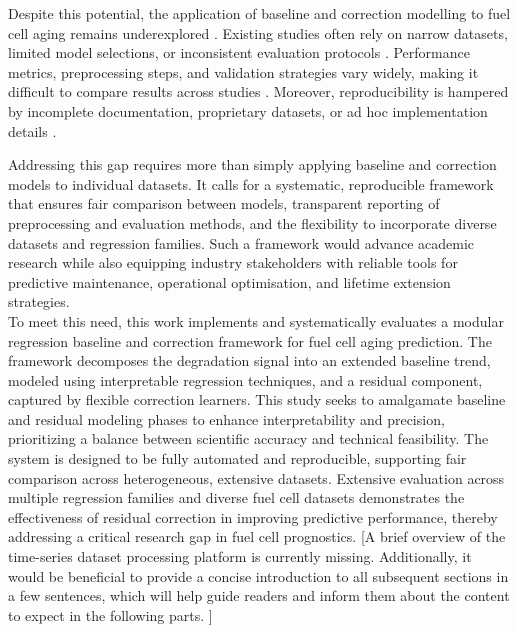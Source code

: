 Despite this potential, the application of baseline and correction modelling to fuel cell aging remains underexplored \cite{Humphreys2020Prognostics,Shah2021IJHE,Song2019Review}. Existing studies often rely on narrow datasets, limited model selections, or inconsistent evaluation protocols \cite{Humphreys2020Prognostics,Attia2020BatteryScience}. Performance metrics, preprocessing steps, and validation strategies vary widely, making it difficult to compare results across studies \cite{Karpatne2019TGDS,Willard2022NRP}. Moreover, reproducibility is hampered by incomplete documentation, proprietary datasets, or ad hoc implementation details \cite{Raissi2019PINN,IEA2022GlobalHydrogen}.  

Addressing this gap requires more than simply applying baseline and correction models to individual datasets. It calls for a systematic, reproducible framework that ensures fair comparison between models, transparent reporting of preprocessing and evaluation methods, and the flexibility to incorporate diverse datasets and regression families\cite{Willard2022NRP,Karpatne2019TGDS,Severson2019BatteryPrognostics}. Such a framework would advance academic research while also equipping industry stakeholders with reliable tools for predictive maintenance, operational optimisation, and lifetime extension strategies\cite{Rasouli2022DigitalTwin,Nguyen2021EnergiesPEMFCdurability,HydrogenCouncil2020Report}.
\noindent\\
To meet this need, this work implements and systematically evaluates a modular regression baseline and correction framework for fuel cell aging prediction. The framework decomposes the degradation signal into an extended baseline trend, modeled using interpretable regression techniques, and a residual component, captured by flexible correction learners. This study seeks to amalgamate baseline and residual modeling phases to enhance interpretability and precision, prioritizing a balance between scientific accuracy and technical feasibility. The system is designed to be fully automated and reproducible, supporting fair comparison across heterogeneous, extensive datasets. Extensive evaluation across multiple regression families and diverse fuel cell datasets demonstrates the effectiveness of residual correction in improving predictive performance, thereby addressing a critical research gap in fuel cell prognostics. [A brief overview of the time-series dataset processing platform is currently missing. Additionally, it would be beneficial to provide a concise introduction to all subsequent sections in a few sentences, which will help guide readers and inform them about the content to expect in the following parts.
]



